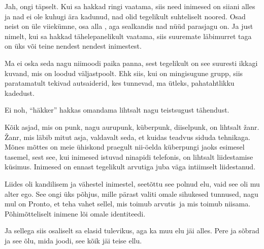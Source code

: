 Jah, ongi täpselt. Kui sa hakkad ringi vaatama, siis need inimesed on siiani 
alles ja nad ei ole kuhugi ära kadunud, nad olid tegelikult suhteliselt noored. 
Osad neist on üle viiekümne, osa alla , aga sealkandis nad nüüd parasjagu on. 
Ja just nimelt, kui sa hakkad tähelepanelikult vaatama, siis suuremate 
läbimurret taga on üks või teine nendest nendest inimestest.
                 

Ma ei oska seda nagu niimoodi paika panna, sest tegelikult on see suuresti 
ikkagi kuvand, mis on loodud väljastpoolt. Ehk siis, kui on mingisugune grupp, 
siis paratamatult tekivad  autsaiderid, kes tunnevad, ma ütleks, pahatahtlikku 
kadedust. 


Ei noh, \enquote{häkker} hakkas omandama lihtsalt nagu teistsugust tähendust.


Kõik asjad, mis on punk, nagu aurupunk, küberpunk, diiselpunk, on lihtsalt 
žanr. Žanr, mis läbib mitut asja, valdavalt seda, et kuidas teadvus siduda 
tehnikaga. Mõnes mõttes on meie ühiskond praegult nii-öelda küberpungi jaoks 
esimesel tasemel, sest see, kui inimesed istuvad ninapidi telefonis, on 
lihtsalt liidestamise küsimus. Inimesed on ennast tegelikult arvutiga juba väga 
intiimselt liidestanud.


Liides oli kandilisem ja vähestel inimestel, seetõttu see polnud elu, vaid see 
oli mu alter ego. See ongi üks põhjus, mille pärast valiti omale sihukesed 
tunnused, nagu mul on Pronto, et teha vahet sellel, mis toimub arvutis ja mis 
toimub niisama. Põhimõtteliselt inimene lõi omale identiteedi. 


Ja sellega siis osaliselt sa elasid tulevikus, aga ka muu elu jäi alles. Pere 
ja  sõbrad ja see õlu, mida joodi, see kõik jäi teise ellu.


